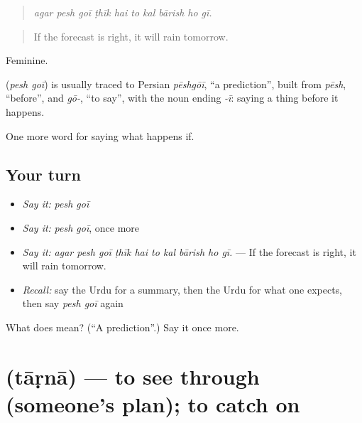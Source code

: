 \begin{quote}
         
\end{quote}

\begin{quote}
\emph{agar pesh goī ṭhīk hai to kal bārish ho gī.}
\end{quote}

\begin{quote}
If the forecast is right, it will rain tomorrow.
\end{quote}

Feminine.

\begin{cousinweb}
\textbf{ } (\emph{pesh goī}) is usually traced to Persian \emph{pēshgōī}, \textquotedblleft{}a prediction\textquotedblright{}, built from \emph{pēsh}, \textquotedblleft{}before\textquotedblright{}, and \emph{gō-}, \textquotedblleft{}to say\textquotedblright{}, with the noun ending \emph{-ī}: saying a thing before it happens.
\end{cousinweb}

\begin{grammarlens}[title={What you've built}]
One more word for saying what happens if.
\end{grammarlens}

\subsection*{Your turn}
\begin{itemize}
\raggedright
  \item \emph{Say it:} \emph{pesh goī}
  \item \emph{Say it:} \emph{pesh goī}, once more
  \item \emph{Say it:} \emph{agar pesh goī ṭhīk hai to kal bārish ho gī.} — If the forecast is right, it will rain tomorrow.
  \item \emph{Recall:} say the Urdu for a summary, then the Urdu for what one expects, then say \emph{pesh goī} again
\end{itemize}

\begin{tcolorbox}[breakable,colback=teal!4,colframe=teal!35!black,title={Before you move on}]
What does   mean? (\textquotedblleft{}A prediction\textquotedblright{}.) Say it once more.
\end{tcolorbox}
\section[\texorpdfstring{\ur{تاڑنا} (tāṛnā)}{تاڑنا (tāṛnā)}]{ (tāṛnā) — to see through (someone's plan); to catch on}

